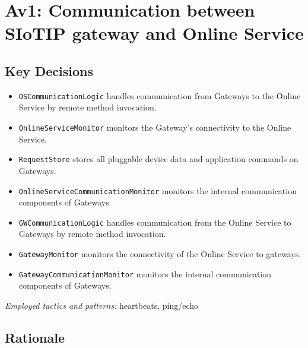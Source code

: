 \section{Av1: Communication between SIoTIP gateway and Online Service}

    \subsection*{Key Decisions}

        \begin{itemize}
            \item \texttt{OSCommunicationLogic} handles communication from Gateways to the Online Service by remote method invocation.
        	\item \texttt{OnlineServiceMonitor} monitors the Gateway's connectivity to the Online Service.
            \item \texttt{RequestStore} stores all pluggable device data and application commands on Gateways.
        	\item \texttt{OnlineServiceCommunicationMonitor} monitors the internal communication components of Gateways.

            \item \texttt{GWCommunicationLogic} handles communication from the Online Service to Gateways by remote method invocation.
        	\item \texttt{GatewayMonitor} monitors the connectivity of the Online Service to gateways.
        	\item \texttt{GatewayCommunicationMonitor} monitors the internal communication components of Gateways.
        \end{itemize}
        \emph{Employed tactics and patterns:} heartbeats, ping/echo


    \subsection*{Rationale}
